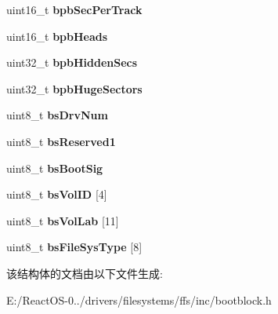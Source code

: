 \begin{DoxyCompactItemize}
uint16\+\_\+t {\bfseries bpb\+Sec\+Per\+Track}
\item 
\mbox{\label{structmbr__bpb_f_a_t16_a1f226a60d8d2005e504b881de21d15f2}} 
uint16\+\_\+t {\bfseries bpb\+Heads}
\item 
\mbox{\label{structmbr__bpb_f_a_t16_a5a9e1a0e4e9f15ec95ee120185f72a0d}} 
uint32\+\_\+t {\bfseries bpb\+Hidden\+Secs}
\item 
\mbox{\label{structmbr__bpb_f_a_t16_a5ad40b5b54ac0e0367f6f412ec001356}} 
uint32\+\_\+t {\bfseries bpb\+Huge\+Sectors}
\item 
\mbox{\label{structmbr__bpb_f_a_t16_adf670ca728d4e0d7f70c48215979c21e}} 
uint8\+\_\+t {\bfseries bs\+Drv\+Num}
\item 
\mbox{\label{structmbr__bpb_f_a_t16_a7ee7c0ed16a46160bcb070d4fbcd9745}} 
uint8\+\_\+t {\bfseries bs\+Reserved1}
\item 
\mbox{\label{structmbr__bpb_f_a_t16_aac6d31a1f54c4805d85974b2780a3b04}} 
uint8\+\_\+t {\bfseries bs\+Boot\+Sig}
\item 
\mbox{\label{structmbr__bpb_f_a_t16_a0ed215e612e1570504175063cad21f63}} 
uint8\+\_\+t {\bfseries bs\+Vol\+ID} \mbox{[}4\mbox{]}
\item 
\mbox{\label{structmbr__bpb_f_a_t16_a44e5084a92bc2571d9f7b77bdcb815cc}} 
uint8\+\_\+t {\bfseries bs\+Vol\+Lab} \mbox{[}11\mbox{]}
\item 
\mbox{\label{structmbr__bpb_f_a_t16_ae4ad4c1056603a9c18c660c36f35bee3}} 
uint8\+\_\+t {\bfseries bs\+File\+Sys\+Type} \mbox{[}8\mbox{]}
\end{DoxyCompactItemize}


该结构体的文档由以下文件生成\+:\begin{DoxyCompactItemize}
\item 
E\+:/\+React\+O\+S-\/0../drivers/filesystems/ffs/inc/bootblock.\+h\end{DoxyCompactItemize}
